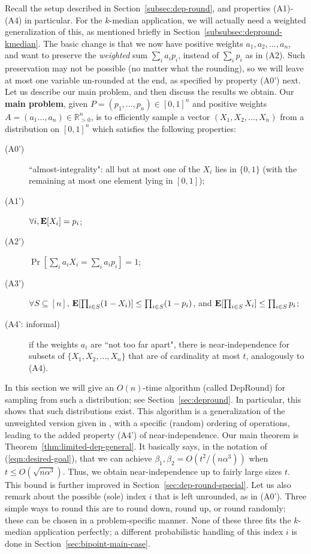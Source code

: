 \newcommand{\simplify}{\textsc{Simplify}}
\newcommand{\E}{\text{\bf E}}
\newcommand{\X}{\mathbf{X}}
\newcommand{\qavg}{\hat{q}}
\newcommand{\alphavg}{\hat{\alpha}}

Recall the setup described in Section~\ref{subsec:dep-round}, and properties (A1)-(A4) in particular. For the $k$-median application, we will actually need a weighted generalization of this, as mentioned briefly in Section~\ref{subsubsec:depround-kmedian}. The basic change is that we now have positive weights $a_1, a_2, \ldots, a_n$, and want to preserve the \emph{weighted} sum $\sum_i a_i p_i$, instead of $\sum_i p_i$ as in (A2). Such preservation may not be possible (no matter what the rounding), so we will leave at most one variable un-rounded at the end, as specified by property (A0') next. Let us describe our main problem, and then discuss the results we obtain. Our \textbf{main problem},  
given $P=(p_1,\dots,p_n)\in[0,1]^n$ and positive weights $A=(a_1\dots,a_n)\in\mathbb{R}_{>0}^n$, is to efficiently sample a vector $(X_1,X_2,\dots,X_n)$ from a distribution on $[0,1]^n$ which satisfies the following properties:
\begin{description}
\item[(A0')] ``almost-integrality": all but at most one of the $X_i$ lies in $\{0,1\}$ (with the remaining at most one element lying in $[0,1]$); 
\item[(A1')] $\forall i, \E[X_i]=p_i$;
\item[(A2')] $\Pr[\sum_i a_iX_i = \sum_i a_ip_i]=1$;
\item[(A3')] $\forall S \subseteq [n]$, $\E[\prod_{i \in S} (1 - X_i)] \leq \prod_{i \in S} (1 - p_i)$, and 
$\E[\prod_{i \in S} X_i] \leq \prod_{i \in S} p_i$;
\item[(A4': informal)] if the weights $a_i$ are ``not too far apart", there is near-independence for subsets of $\{X_1, X_2, \ldots, X_n\}$ that are of cardinality at most $t$, 
analogously to (A4). 
\end{description}

In this section we will give an $O(n)$-time algorithm (called {\sc DepRound}) for sampling from such a distribution; see Section~\ref{sec:depround}.
In particular, this shows that such distributions exist. This algorithm is a generalization of the unweighted version given in \cite{srin:level-sets}, with a specific (random) ordering of operations, leading to the added property (A4') of near-independence. 
Our main theorem is Theorem~\ref{thm:limited-dep-general}. 
It basically says, in the notation of (\ref{eqn:desired-goal}), that we can achieve $\beta_1, \beta_2 = O(t^2/(n \alpha^3))$ when 
$t \leq O(\sqrt{n \alpha^3})$. Thus, we obtain near-independence up to fairly large sizes $t$. This bound is further improved in 
Section~\ref{sec:dep-round-special}. Let us also remark about the possible (sole) index $i$ that is left unrounded, as in (A0'). Three simple ways to round this are to round down, round up, or round randomly; these can be chosen in a problem-specific manner. None of these three fits the $k$-median application perfectly; a different probabilistic handling of this index $i$ is done in Section~\ref{sec:bipoint-main-case}. 

